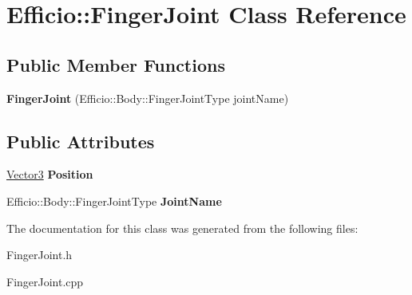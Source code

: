 \hypertarget{class_efficio_1_1_finger_joint}{}\section{Efficio\+:\+:Finger\+Joint Class Reference}
\label{class_efficio_1_1_finger_joint}
\subsection*{Public Member Functions}
\begin{DoxyCompactItemize}
\item 
{\bfseries Finger\+Joint} (Efficio\+::\+Body\+::\+Finger\+Joint\+Type joint\+Name)\hypertarget{class_efficio_1_1_finger_joint_a907594a1a38f6e67c65a76ba2b9d23b5}{}\label{class_efficio_1_1_finger_joint_a907594a1a38f6e67c65a76ba2b9d23b5}

\end{DoxyCompactItemize}
\subsection*{Public Attributes}
\begin{DoxyCompactItemize}
\item 
\hyperlink{class_efficio_1_1_vector3}{Vector3} {\bfseries Position}\hypertarget{class_efficio_1_1_finger_joint_a8a0ae42e54b38ab49019330560c881c1}{}\label{class_efficio_1_1_finger_joint_a8a0ae42e54b38ab49019330560c881c1}

\item 
Efficio\+::\+Body\+::\+Finger\+Joint\+Type {\bfseries Joint\+Name}\hypertarget{class_efficio_1_1_finger_joint_a7de278b4f129047aa7049f75317ffd89}{}\label{class_efficio_1_1_finger_joint_a7de278b4f129047aa7049f75317ffd89}

\end{DoxyCompactItemize}


The documentation for this class was generated from the following files\+:\begin{DoxyCompactItemize}
\item 
Finger\+Joint.\+h\item 
Finger\+Joint.\+cpp\end{DoxyCompactItemize}
